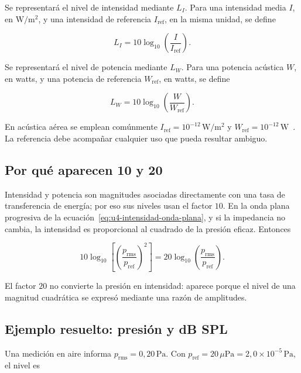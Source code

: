 Se representará el nivel de intensidad mediante \(L_I\). Para una intensidad
media \(I\), en \(\text{W}/\text{m}^2\), y una intensidad de referencia
\(I_\mathrm{ref}\), en la misma unidad, se define

\begin{equation}
    L_I=10\log_{10}\!\left(\frac{I}{I_\mathrm{ref}}\right).
    \label{eq:u4-nivel-intensidad}
\end{equation}

Se representará el nivel de potencia mediante \(L_W\). Para una potencia
acústica \(W\), en watts, y una potencia de referencia \(W_\mathrm{ref}\), en
watts, se define
\nopagebreak[4]

\begin{equation}
    L_W=10\log_{10}\!\left(\frac{W}{W_\mathrm{ref}}\right).
    \label{eq:u4-nivel-potencia}
\end{equation}

En acústica aérea se emplean comúnmente
\(I_\mathrm{ref}=10^{-12}\,\text{W}/\text{m}^2\) y
\(W_\mathrm{ref}=10^{-12}\,\text{W}\)~\cite{nistSP811,iso1683_2015}. La referencia debe acompañar cualquier
uso que pueda resultar ambiguo.

\subsection{Por qué aparecen 10 y 20}
\label{sec:u4-factores-logaritmicos}

Intensidad y potencia son magnitudes asociadas directamente con una tasa de
transferencia de energía; por eso sus niveles usan el factor \(10\). En la
onda plana progresiva de la ecuación~\eqref{eq:u4-intensidad-onda-plana}, y si
la impedancia no cambia, la intensidad es proporcional al cuadrado de la
presión eficaz. Entonces

\[
    10\log_{10}\!\left[
       \left(\frac{p_\mathrm{rms}}{p_\mathrm{ref}}\right)^2
    \right]
    =20\log_{10}\!\left(
       \frac{p_\mathrm{rms}}{p_\mathrm{ref}}\right).
\]

El factor \(20\) no convierte la presión en intensidad: aparece porque el
nivel de una magnitud cuadrática se expresó mediante una razón de amplitudes.

\subsection{Ejemplo resuelto: presión y dB SPL}
\label{sec:u4-ejemplo-nivel}

Una medición en aire informa
\(p_\mathrm{rms}=0{,}20\,\text{Pa}\). Con
\(p_\mathrm{ref}=20\,\mu\text{Pa}
=2{,}0\times10^{-5}\,\text{Pa}\), el nivel es

